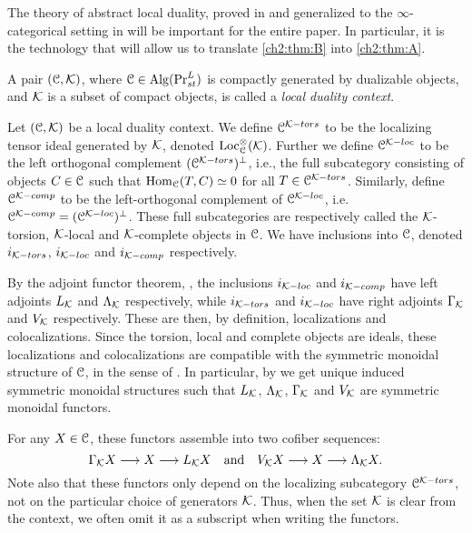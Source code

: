 The theory of abstract local duality, proved in \cite{hovey-palmiery-strickland_97} and generalized to the $\infty$-categorical setting in \cite{barthel-heard-valenzuela_2018} will be important for the entire paper. In particular, it is the technology that will allow us to translate \cref{ch2:thm:B} into \cref{ch2:thm:A}. 

\begin{definition}
    \label{ch2:def:local-duality-context}
    A pair $(\EuScript{C}, \mathcal{K})$, where $\EuScript{C}\in \operatorname{Alg}(\mathrm{Pr}_{st}^L)$ is compactly generated by dualizable objects, and $\mathcal{K}$ is a subset of compact objects, is called a \emph{local duality context}.
\end{definition}

\begin{construction}
    Let $(\EuScript{C}, \mathcal{K})$ be a local duality context. We define $\EuScript{C}^{\mathcal{K}-tors}$ to be the localizing tensor ideal generated by $\mathcal{K}$, denoted $\operatorname{Loc}^\otimes_{\EuScript{C}}(\mathcal{K})$. Further we define $\EuScript{C}^{\mathcal{K}-loc}$ to be the left orthogonal complement $(\EuScript{C}^{\mathcal{K}-tors})^\perp$, i.e., the full subcategory consisting of objects $C\in \EuScript{C}$ such that $\operatorname{Hom}_{\EuScript{C}}(T,C)\simeq 0$ for all $T\in \EuScript{C}^{\mathcal{K}-tors}$. Similarly, define $\EuScript{C}^{\mathcal{K}-comp}$ to be the left-orthogonal complement of $\EuScript{C}^{\mathcal{K}-loc}$, i.e. $\EuScript{C}^{\mathcal{K}-comp}= (\EuScript{C}^{\mathcal{K}-loc})^\perp$. These full subcategories are respectively called the $\mathcal{K}$-torsion, $\mathcal{K}$-local and $\mathcal{K}$-complete objects in $\EuScript{C}$. We have inclusions into $\EuScript{C}$, denoted $i_{\mathcal{K}-tors}$, $i_{\mathcal{K}-loc}$ and $i_{\mathcal{K}-comp}$ respectively. 
    
    By the adjoint functor theorem, \cite[5.5.2.9]{lurie_09}, the inclusions $i_{\mathcal{K}-loc}$ and $i_{\mathcal{K}-comp}$ have left adjoints $L_{\mathcal{K}}$ and $\Lambda_{\mathcal{K}}$ respectively, while $i_{\mathcal{K}-tors}$ and $i_{\mathcal{K}-loc}$ have right adjoints $\Gamma_{\mathcal{K}}$ and $V_{\mathcal{K}}$ respectively. These are then, by definition, localizations and colocalizations. Since the torsion, local and complete objects are ideals, these localizations and colocalizations are compatible with the symmetric monoidal structure of $\EuScript{C}$, in the sense of \cite[2.2.1.7]{Lurie_HA}. In particular, by \cite[2.2.1.9]{Lurie_HA} we get unique induced symmetric monoidal structures such that $L_{\mathcal{K}}$, $\Lambda_{\mathcal{K}}$, $\Gamma_{\mathcal{K}}$ and $V_{\mathcal{K}}$ are symmetric monoidal functors. 

    For any $X\in \EuScript{C}$, these functors assemble into two cofiber sequences:
    $$\Gamma_{\mathcal{K}} X \longrightarrow X \longrightarrow L_{\mathcal{K}} X \quad \text{and}\quad V_{\mathcal{K}} X \longrightarrow X \longrightarrow \Lambda_{\mathcal{K}} X.$$
    Note also that these functors only depend on the localizing subcategory $\EuScript{C}^{\mathcal{K}-tors}$, not on the particular choice of generators $\mathcal{K}$. Thus, when the set $\mathcal{K}$ is clear from the context, we often omit it as a subscript when writing the functors. 
\end{construction}

